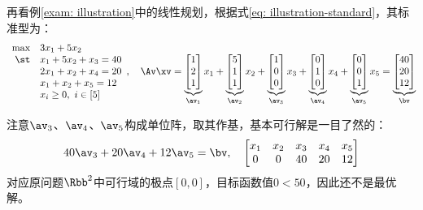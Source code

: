 \documentclass{ctexart}
\begin{document}
\begin{example} \label{exam: simplex}
    再看例\ref{exam: illustration}中的线性规划，根据式\eqref{eq: illustration-standard}，其标准型为：
    \begin{align*}
        \begin{array}{rl}
            \max & 3 x_1 + 5 x_2          \\
            \st  & x_1 + 5 x_2 + x_3 = 40 \\
                 & 2 x_1 + x_2 + x_4 = 20 \\
                 & x_1 + x_2 + x_5 = 12   \\
                 & x_i \ge 0, ~ i \in [5]
        \end{array}, \quad \Av \xv =
        \underbrace{\begin{bmatrix}
                            1 \\ 2 \\ 1
                        \end{bmatrix}}_{\av_1} x_1 +
        \underbrace{\begin{bmatrix}
                            5 \\ 1 \\ 1
                        \end{bmatrix}}_{\av_2} x_2 +
        \underbrace{\begin{bmatrix}
                            1 \\ 0 \\ 0
                        \end{bmatrix}}_{\av_3} x_3 +
        \underbrace{\begin{bmatrix}
                            0 \\ 1 \\ 0
                        \end{bmatrix}}_{\av_4} x_4 +
        \underbrace{\begin{bmatrix}
                            0 \\ 0 \\ 1
                        \end{bmatrix}}_{\av_5} x_5 =
        \underbrace{\begin{bmatrix}
                            40 \\ 20 \\ 12
                        \end{bmatrix}}_{\bv}
    \end{align*}

    注意$\av_3$、$\av_4$、$\av_5$构成单位阵，取其作基，基本可行解是一目了然的：
    \begin{align*}
        40 \av_3 + 20 \av_4 + 12 \av_5 = \bv, \quad
        \begin{bmatrix}
            x_1 & x_2 & x_3 & x_4 & x_5 \\
            0   & 0   & 40  & 20  & 12
        \end{bmatrix}
    \end{align*}
    对应原问题$\Rbb^2$中可行域的极点$[0,0]$，目标函数值$0 < 50$，因此还不是最优解。


\end{example}
\end{document}
